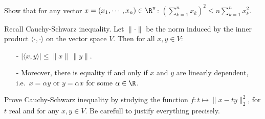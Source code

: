 \documentclass[11pt,nocut]{article}
\begin{document}
\vspace{1cm}

\begin{problem}[1.5 point]
    Show that for any vector $x = (x_1, \cdots, x_n) \in \R^n$: $\displaystyle \left(\sum_{k=1}^n x_k \right)^2 \leq n \sum_{k = 1}^n x_k^2$.
\end{problem}

\vspace{1cm}

\begin{problem}[$\star$] Recall Cauchy-Schwarz inequality. Let $\| \cdot \|$ be the norm induced by the inner product $\langle \cdot , \cdot \rangle$ on the vector space $V$.  Then for all $x,y \in V$:
    \begin{itemize}
        \item[- ] $| \langle x,y \rangle | \leq \|x\| \, \|y\|$.
    	\item[- ] Moreover, there is equality if and only if $x$ and $y$ are linearly dependent, i.e.\ $x = \alpha y$ or $y = \alpha x$ for some $\alpha \in \R$.
    \end{itemize}
Prove Cauchy-Schwarz inequality by studying the function $f: t \mapsto \lVert x - t y \rVert_2^2$, for $t$ real and for any $x,y \in V$. Be carefull to justify everything precisely.
\end{problem}



%
%
\end{document}
